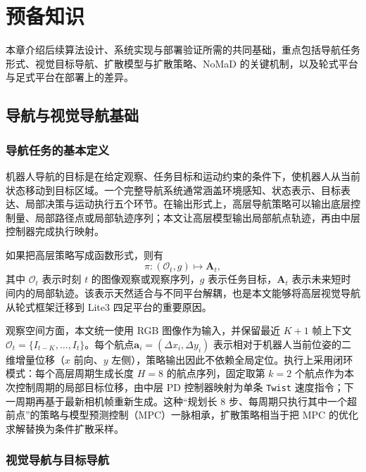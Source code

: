 ﻿%

\chapter{预备知识}

本章介绍后续算法设计、系统实现与部署验证所需的共同基础，重点包括导航任务形式、视觉目标导航、扩散模型与扩散策略、NoMaD 的关键机制，以及轮式平台与足式平台在部署上的差异。

\section{导航与视觉导航基础}

\subsection{导航任务的基本定义}

机器人导航的目标是在给定观察、任务目标和运动约束的条件下，使机器人从当前状态移动到目标区域。一个完整导航系统通常涵盖环境感知、状态表示、目标表达、局部决策与运动执行五个环节\cite{thrun2005probabilistic,anderson2018evaluation}。在输出形式上，高层导航策略可以输出底层控制量、局部路径点或局部轨迹序列；本文让高层模型输出局部航点轨迹，再由中层控制器完成执行映射。

如果把高层策略写成函数形式，则有
\begin{equation}
\pi : (\mathcal{O}_t, g) \mapsto \mathbf{A}_t ,
\end{equation}
其中 $\mathcal{O}_t$ 表示时刻 $t$ 的图像观察或观察序列，$g$ 表示任务目标，$\mathbf{A}_t$ 表示未来短时间内的局部轨迹。该表示天然适合与不同平台解耦，也是本文能够将高层视觉导航从轮式框架迁移到 Lite3 四足平台的重要原因。

观察空间方面，本文统一使用 RGB 图像作为输入，并保留最近 $K+1$ 帧上下文 $\mathcal{O}_t = \{I_{t-K}, \ldots, I_t\}$。每个航点$\mathbf{a}_i = (\Delta x_i, \Delta y_i)$ 表示相对于机器人当前位姿的二维增量位移（$x$ 前向、$y$ 左侧），策略输出因此不依赖全局定位。执行上采用闭环模式：每个高层周期生成长度 $H=8$ 的航点序列，固定取第 $k=2$ 个航点作为本次控制周期的局部目标位移，由中层 PD 控制器映射为单条 \texttt{Twist} 速度指令；下一周期再基于最新相机帧重新生成。这种``规划长 8 步、每周期只执行其中一个超前点''的策略与模型预测控制（MPC）一脉相承，扩散策略相当于把 MPC 的优化求解替换为条件扩散采样。

\subsection{视觉导航与目标导航}

